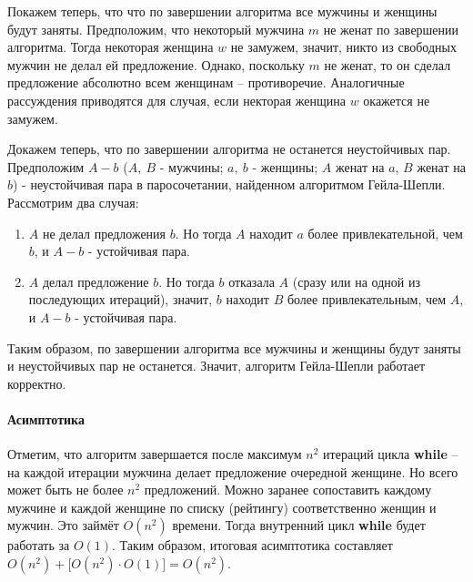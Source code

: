 \documentclass[a4paper,12pt]{article}
\begin{document}
Покажем теперь, что что по завершении алгоритма все мужчины и женщины будут заняты. Предположим, что некоторый мужчина $m$ не женат по завершении алгоритма. Тогда некоторая женщина $w$ не замужем, значит, никто из свободных мужчин не делал ей предложение. Однако, поскольку $m$ не женат, то он сделал предложение абсолютно всем женщинам -- противоречие. Аналогичные рассуждения приводятся для случая, если некторая женщина $w$ окажется не замужем.

Докажем теперь, что по завершении алгоритма не останется неустойчивых пар. Предположим $A-b$ ($A,\ B$ - мужчины; $a,\ b$ - женщины; $A$ женат на $a$, $B$ женат на $b$) - неустойчивая пара в паросочетании, найденном алгоритмом Гейла-Шепли. Рассмотрим два случая:
\begin{enumerate}
    \item $A$ не делал предложения $b$. Но тогда  $A$ находит $a$ более привлекательной, чем $b$, и $A-b$ - устойчивая пара.
    \item $A$ делал предложение $b$. Но тогда $b$ отказала $A$ (сразу или на одной из последующих итераций), значит, $b$ находит $B$ более привлекательным, чем $A$, и $A-b$ - устойчивая пара.
\end{enumerate}

Таким образом, по завершении алгоритма все мужчины и женщины будут заняты и неустойчивых пар не останется. Значит, алгоритм Гейла-Шепли работает корректно.

\paragraph{Асимптотика}

Отметим, что алгоритм завершается после максимум $n^2$ итераций цикла \textbf{while} -- на каждой итерации мужчина делает предложение очередной женщине. Но всего может быть не более $n^2$ предложений. Можно заранее сопоставить каждому мужчине и каждой женщине по списку (рейтингу) соответственно женщин и мужчин. Это займёт $O(n^2)$ времени. Тогда внутренний цикл \textbf{while} будет работать за $O(1)$. Таким образом, итоговая асимптотика составляет $O(n^2) + \big[O(n^2) \cdot O(1)\big] = O(n^2)$.

\newpage
\end{document}
